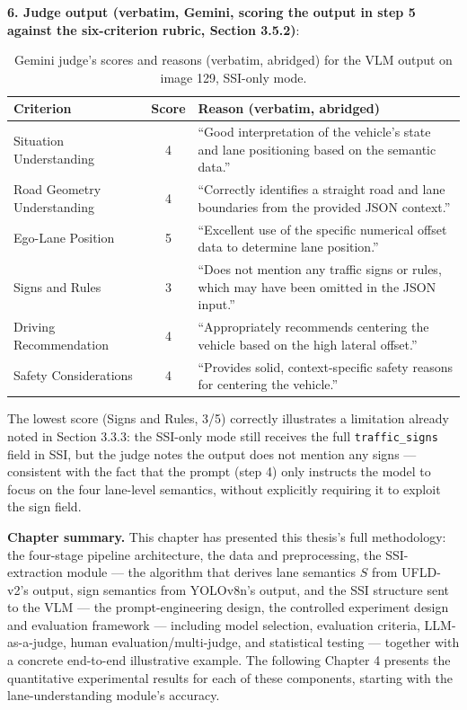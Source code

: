 \documentclass[12pt,a4paper]{report}
\begin{document}
\textbf{6. Judge output (verbatim, Gemini, scoring the output in step 5 against the six-criterion rubric, Section 3.5.2)}:

\begin{table}[htbp]
    \centering
    \small
    \caption[Gemini judge's scores and reasons for the illustrative image (Section 3.6)]{Gemini judge's scores and reasons (verbatim, abridged) for the VLM output on image 129, SSI-only mode.}
    \label{tab:3.7}
    \begin{tabularx}{\linewidth}{@{}p{3.4cm}cX@{}}
        \toprule
        \textbf{Criterion} & \textbf{Score} & \textbf{Reason (verbatim, abridged)} \\
        \midrule
        Situation Understanding & 4 & ``Good interpretation of the vehicle's state and lane positioning based on the semantic data.'' \\
        Road Geometry Understanding & 4 & ``Correctly identifies a straight road and lane boundaries from the provided JSON context.'' \\
        Ego-Lane Position & 5 & ``Excellent use of the specific numerical offset data to determine lane position.'' \\
        Signs and Rules & 3 & ``Does not mention any traffic signs or rules, which may have been omitted in the JSON input.'' \\
        Driving Recommendation & 4 & ``Appropriately recommends centering the vehicle based on the high lateral offset.'' \\
        Safety Considerations & 4 & ``Provides solid, context-specific safety reasons for centering the vehicle.'' \\
        \bottomrule
    \end{tabularx}
\end{table}

The lowest score (Signs and Rules, 3/5) correctly illustrates a limitation already noted in Section 3.3.3: the SSI-only mode still receives the full \texttt{traffic\_signs} field in SSI, but the judge notes the output does not mention any signs --- consistent with the fact that the prompt (step 4) only instructs the model to focus on the four lane-level semantics, without explicitly requiring it to exploit the sign field.

\textbf{Chapter summary.} This chapter has presented this thesis's full methodology: the four-stage pipeline architecture, the data and preprocessing, the SSI-extraction module --- the algorithm that derives lane semantics $S$ from UFLD-v2's output, sign semantics from YOLOv8n's output, and the SSI structure sent to the VLM --- the prompt-engineering design, the controlled experiment design and evaluation framework --- including model selection, evaluation criteria, LLM-as-a-judge, human evaluation/multi-judge, and statistical testing --- together with a concrete end-to-end illustrative example. The following Chapter 4 presents the quantitative experimental results for each of these components, starting with the lane-understanding module's accuracy.
\end{document}
